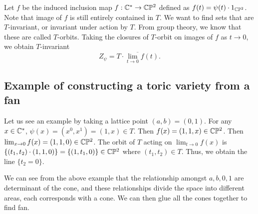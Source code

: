     Let $f$ be the induced inclusion map $f: \mathbb{C}^\ast \rightarrow \mathbb{C}\mathbb{P}^2$ defined as $f(t) = \psi(t) \cdot 1_{\mathbb{C}\mathbb{P}^2}$. 
    Note that image of $f$ is still entirely contained in $T$.
    We want to find sets that are $T$-invariant, or invariant under action by $T$. 
    From group theory, we know that these are called $T$-orbits.
    Taking the closures of $T$-orbit on images of $f$ as $t \rightarrow 0$, 
    we obtain $T$-invariant 
    \[Z_\psi = \overline{T \cdot \lim_{t \rightarrow 0} f(t)}.\]

\subsection{Example of constructing a toric variety from a fan}
\label{subsec:contructing-toric-variety}
    Let us see an example by taking a lattice point $(a, b) = (0, 1)$.
    For any $x \in \mathbb{C}^\ast$, $\psi(x)= (x^0, x^1) = (1, x) \in T$. Then $f(x) = (1, 1, x) \in \mathbb{C}\mathbb{P}^2$. 
    Then $\lim_{x \rightarrow 0} f(x) = (1, 1, 0) \in \mathbb{C}\mathbb{P}^2$.
    The orbit of $T$ acting on $\lim_{t \rightarrow 0} f(x)$ is $\{(t_1, t_2) \cdot (1, 1, 0)\} = \{(1, t_1, 0)\} \in \mathbb{C}\mathbb{P}^2$
    where $(t_1, t_2) \in T$.
    Thus, we obtain the line $\{t_2 = 0\}$. 

    We can see from the above example that the relationship amongst $a, b, 0, 1$ are determinant of the cone,
    and these relationships divide the space into different areas,
    each corresponds with a cone. 
    We can then glue all the cones together to find fan. 
